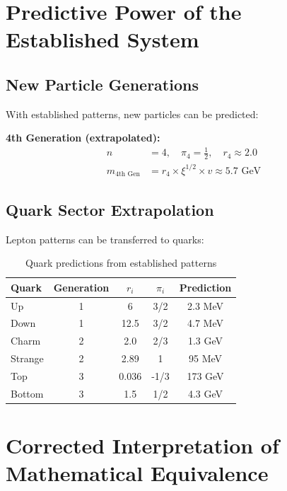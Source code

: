	\section{Predictive Power of the Established System}
	\label{sec:predictive_power}
	
	\subsection{New Particle Generations}
	\label{subsec:new_generations}
	
	With established patterns, new particles can be predicted:
	
	\textbf{4th Generation (extrapolated):}
	\begin{align}
		n &= 4, \quad \pi_4 = \frac{1}{2}, \quad r_4 \approx 2.0 \\
		m_{\text{4th Gen}} &= r_4 \times \xi^{1/2} \times v \approx 5.7 \text{ GeV}
	\end{align}
	
	\subsection{Quark Sector Extrapolation}
	\label{subsec:quark_extrapolation}
	
	Lepton patterns can be transferred to quarks:
	
	\begin{table}[H]
		\centering

\begin{tabular}{lcccc}
			\toprule
			\textbf{Quark} & \textbf{Generation} & \textbf{$r_i$} & \textbf{$\pi_i$} & \textbf{Prediction} \\
			\midrule
			Up & 1 & 6 & 3/2 & 2.3 MeV \\
			Down & 1 & 12.5 & 3/2 & 4.7 MeV \\
			Charm & 2 & 2.0 & 2/3 & 1.3 GeV \\
			Strange & 2 & 2.89 & 1 & 95 MeV \\
			Top & 3 & 0.036 & -1/3 & 173 GeV \\
			Bottom & 3 & 1.5 & 1/2 & 4.3 GeV \\
			\bottomrule
		\end{tabular}

		\caption{Quark predictions from established patterns}
		\label{tab:quark_predictions}
	\end{table}
	
	\section{Corrected Interpretation of Mathematical Equivalence}
	\label{sec:corrected_interpretation}
	

